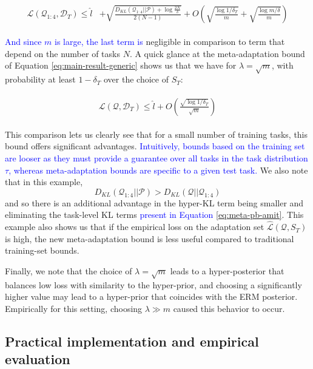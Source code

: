 \documentclass{article}
\theoremstyle{definition}
\newcommand{\LFe}[1]{\textcolor{blue}{#1}}
\begin{document}
\begin{align*}
\begin{split}
	\mathcal{L}(\mathcal{Q}_{1:4},\mathcal{D}_T)\leq \hat{l} &+ \sqrt{\frac{D_{KL}(\mathcal{Q}_{1:4}||\mathcal{P})+\log\frac{2N}{\delta}}{2(N-1)}}
	+O\left (\sqrt{\frac{\log{1/\delta_T}}{m}}+\sqrt{\frac{\log{m/\delta}}{m}}\right )
\end{split}
\end{align*}

\LFe{And since $m$ is large, the last term is } negligible in comparison to term that depend on the number of tasks $N$.
A quick glance at the meta-adaptation bound of Equation \ref{eq:main-result-generic} shows us that we have for $\lambda=\sqrt{m}$, with probability at least $1-\delta_T$ over the choice of $S_T$:

\begin{align*}
\begin{split}
\mathcal{L}(\mathcal{Q},\mathcal{D}_T)\leq \hat{l} + O\left (\frac{\sqrt{\log{1/\delta_T}}}{\sqrt{m}}\right ) 
\end{split}
\end{align*}

This comparison lets us clearly see that for a small number of training tasks, this bound offers significant advantages. \LFe{Intuitively, bounds based on the training set are looser as they must provide a guarantee over all tasks in the task distribution $\tau$, whereas meta-adaptation bounds are specific to a given test task.} We also note that in this example,  $$D_{KL}(\mathcal{Q}_{1:4}||\mathcal{P})>D_{KL}(\mathcal{Q}||\mathcal{Q}_{1:4})$$ 
and so there is an additional advantage in the hyper-KL term being smaller and eliminating the task-level KL terms \LFe{present in Equation \ref{eq:meta-pb-amit}}. This example also shows us that if the empirical loss on the adaptation set $\hat{\mathcal{L}}(\mathcal{Q}, S_T)$ is high, the new meta-adaptation bound is less useful compared to traditional training-set bounds. 

Finally, we note that the choice of $\lambda=\sqrt{m}$ leads to a hyper-posterior that balances low loss with similarity to the hyper-prior, and choosing a significantly higher value may lead to a hyper-prior that coincides with the ERM posterior. Empirically for this setting, choosing $\lambda\gg m$ caused this behavior to occur.

\subsection{Practical implementation and empirical evaluation}
\end{document}
